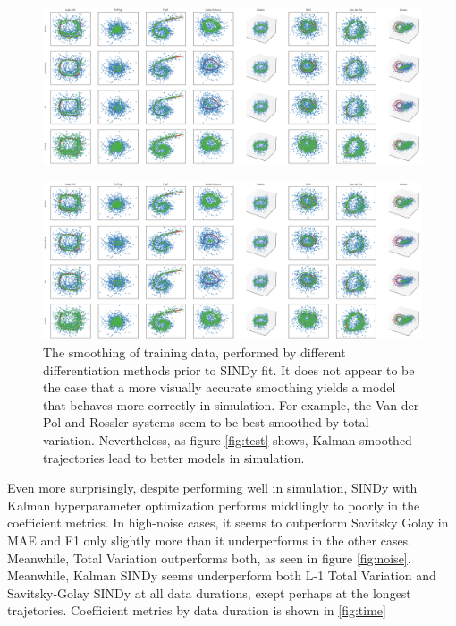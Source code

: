 \documentclass{article}
\begin{document}
\begin{figure}
    \includegraphics[width=\textwidth]{images/summary_train}
\end{figure}
\begin{figure}
    \label{fig:train}
    \includegraphics[width=\textwidth]{images/summary_train}
    \caption{The smoothing of training data, performed by different differentiation methods prior to SINDy fit.  It does not appear to be the case that a more visually accurate smoothing yields a model that behaves more correctly in simulation.  For example, the Van der Pol and Rossler systems seem to be best smoothed by total variation.  Nevertheless, as figure \ref{fig:test} shows, Kalman-smoothed trajectories lead to better models in simulation.}
\end{figure}

Even more surprisingly, despite performing well in simulation, SINDy with Kalman hyperparameter optimization performs middlingly to poorly in the coefficient metrics.  In high-noise cases, it seems to outperform Savitsky Golay in MAE and F1 only slightly more than it underperforms in the other cases.  Meanwhile, Total Variation outperforms both, as seen in figure \ref{fig:noise}. Meanwhile, Kalman SINDy seems underperform both L-1 Total Variation and Savitsky-Golay SINDy at all data durations, exept perhaps at the longest trajetories.  Coefficient metrics by data duration is shown in \ref{fig:time}
\end{document}
